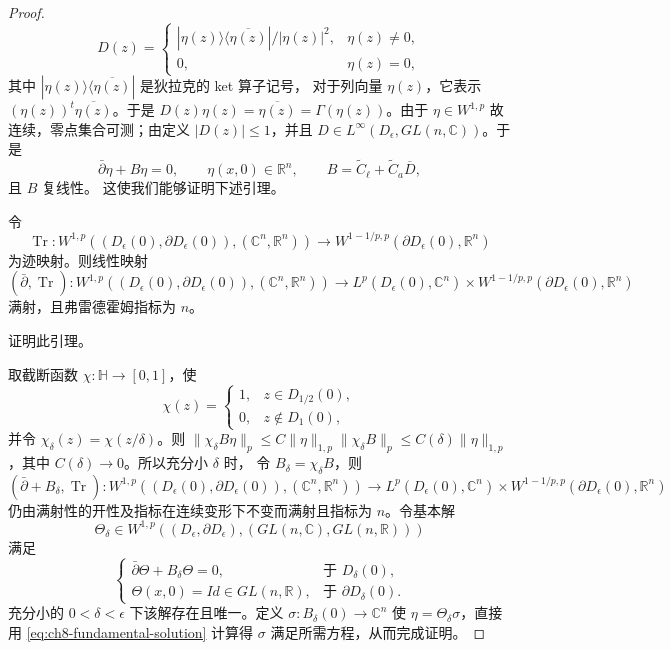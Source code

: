 \begin{proof}
\[
 D(z)=
 \begin{cases}
 |\eta(z)\rangle\langle\overline{\eta(z)}|/|\eta(z)|^2,&\eta(z)\ne0,\\
 0,&\eta(z)=0,
 \end{cases}
\]
其中 $|\eta(z)\rangle\langle\overline{\eta(z)}|$ 是狄拉克的 ket 算子记号，
对于列向量 $\eta(z)$，它表示
$(\eta(z))^t\overline{\eta(z)}$。于是
$D(z)\eta(z)=\overline{\eta(z)}=\Gamma(\eta(z))$。由于
$\eta\in W^{1,p}$ 故连续，零点集合可测；由定义 $|D(z)|\leq1$，并且
$D\in L^\infty(D_\epsilon,GL(n,\mathbb C))$。于是
\[
 \bar\partial\eta+B\eta=0,\qquad
 \eta(x,0)\in\mathbb R^n,\qquad
 B=\widetilde C_\ell+\widetilde C_a\overline D,
\]
且 $B$ 复线性。
这使我们能够证明下述引理。
\begin{lemma}\label{lem:ch8-rh-trace-fredholm}
令
\[
 \operatorname{Tr}:W^{1,p}((D_\epsilon(0),\partial D_\epsilon(0)),
 (\mathbb C^n,\mathbb R^n))
 \longrightarrow W^{1-1/p,p}(\partial D_\epsilon(0),\mathbb R^n)
\]
为迹映射。则线性映射
\[
 (\bar\partial,\operatorname{Tr}):
 W^{1,p}((D_\epsilon(0),\partial D_\epsilon(0)),(\mathbb C^n,\mathbb R^n))
 \longrightarrow L^p(D_\epsilon(0),\mathbb C^n)
 \times W^{1-1/p,p}(\partial D_\epsilon(0),\mathbb R^n)
\]
满射，且弗雷德霍姆指标为 $n$。
\end{lemma}
\begin{exercise}\label{ex:ch8-prove-rh-fredholm}证明此引理。\end{exercise}
取截断函数 $\chi:\mathbb H\to[0,1]$，使
\[
 \chi(z)=
 \begin{cases}
 1,&z\in D_{1/2}(0),\\
 0,&z\notin D_1(0),
 \end{cases}
\]
并令 $\chi_\delta(z)=\chi(z/\delta)$。则
$\|\chi_\delta B\eta\|_p\leq C\|\eta\|_{1,p}\|\chi_\delta B\|_p
\leq C(\delta)\|\eta\|_{1,p}$，其中 $C(\delta)\to0$。所以充分小 $\delta$ 时，
令 $B_\delta=\chi_\delta B$，则
\[
 (\bar\partial+B_\delta,\operatorname{Tr}):
 W^{1,p}((D_\epsilon(0),\partial D_\epsilon(0)),(\mathbb C^n,\mathbb R^n))
 \longrightarrow L^p(D_\epsilon(0),\mathbb C^n)
 \times W^{1-1/p,p}(\partial D_\epsilon(0),\mathbb R^n)
\]
仍由满射性的开性及指标在连续变形下不变而满射且指标为 $n$。令基本解
\[
\Theta_\delta\in W^{1,p}((D_\epsilon,\partial D_\epsilon),
(GL(n,\mathbb C),GL(n,\mathbb R)))
\]
满足
\begin{equation}
\begin{cases}
\bar\partial\Theta+B_\delta\Theta=0,&\text{于 }D_\delta(0),\\
\Theta(x,0)=Id\in GL(n,\mathbb R),&\text{于 }\partial D_\delta(0).
\end{cases}
\label{eq:ch8-fundamental-solution}
\end{equation}
充分小的 $0<\delta<\epsilon$ 下该解存在且唯一。定义
$\sigma:B_\delta(0)\to\mathbb C^n$ 使
$\eta=\Theta_\delta\sigma$，直接用 \eqref{eq:ch8-fundamental-solution} 计算得
$\sigma$ 满足所需方程，从而完成证明。
\end{proof}

